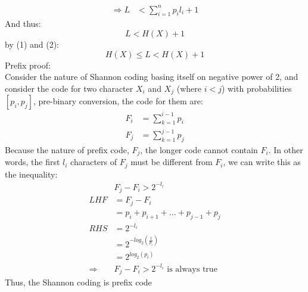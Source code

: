 \documentclass[12pt]{article}
\begin{document}
\begin{enumerate}
\begin{enumerate}
\begin{align*}
            \Rightarrow L &< \sum_{i=1}^{n} p_il_i + 1
        \end{align*}
        And thus:
        \begin{equation}
            L < H(X) + 1
        \end{equation}
        by (1) and (2):
        \begin{equation*}
            H(X) \leq L < H(X) + 1
        \end{equation*}
        Prefix proof:\\
        Consider the nature of Shannon coding basing itself on negative power of 2, and consider the code for two character $X_i$ and $X_j$ (where $i < j$) with probabilities $[p_i,p_j]$, pre-binary conversion, the code for them are:
        \begin{align*}
            F_i &= \sum_{k=1}^{i-1} p_i\\
            F_j &= \sum_{k=1}^{j-1} p_j
        \end{align*}
        Because the nature of prefix code, $F_j$, the longer code cannot contain $F_i$. In other words, the first $l_i$ characters of $F_j$ must be different from $F_i$, we can write this as the inequality:
        \begin{align*}
            &F_j - F_i > 2^{-l_i}\\
            LHF&=  F_j - F_i\\
            &=p_i + p_{i+1} + ... + p_{j-1} + p_j \\
            RHS&= 2^{-l_i}\\
            &=2^{-log_2(\frac{1}{p_i})}\\
            &=2^{log_2(p_i)}\\
            \Rightarrow & F_j - F_i > 2^{-l_i} \text{ is always true}
        \end{align*}
        Thus, the Shannon coding is prefix code
    \end{enumerate}
\end{enumerate}
\end{document}
